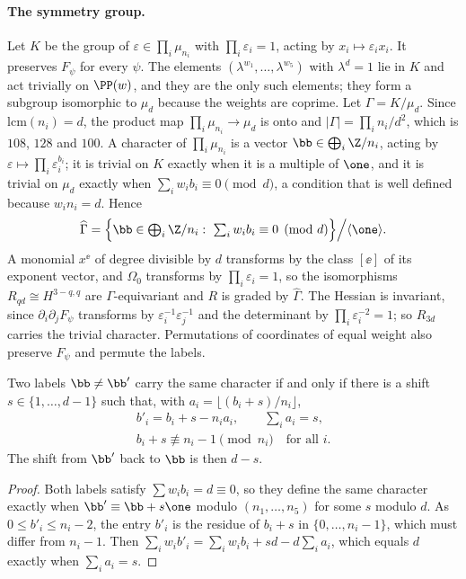 \paragraph*{The symmetry group.}
Let $K$ be the group of $\varepsilon\in\prod_i\mu_{n_i}$ with
$\prod_i\varepsilon_i=1$, acting by $x_i\mapsto\varepsilon_ix_i$. It
preserves $F_\psi$ for every $\psi$. The elements
$(\lambda^{w_1},\dots,\lambda^{w_5})$ with $\lambda^d=1$ lie in $K$ and act
trivially on $\PP(w)$, and they are the only such elements; they form a
subgroup isomorphic to $\mu_d$ because the weights are coprime. Let
$\Gamma=K/\mu_d$. Since $\mathrm{lcm}(n_i)=d$, the product map
$\prod_i\mu_{n_i}\to\mu_d$ is onto and $|\Gamma|=\prod_in_i/d^2$, which is
$108$, $128$ and $100$. A character of $\prod_i\mu_{n_i}$ is a vector
$\bb\in\bigoplus_i\Z/n_i$, acting by $\varepsilon\mapsto\prod_i
\varepsilon_i^{b_i}$; it is trivial on $K$ exactly when it is a multiple of
$\one$, and it is trivial on $\mu_d$ exactly when $\sum_iw_ib_i\equiv0
\pmod d$, a condition that is well defined because $w_in_i=d$. Hence
\[
\widehat\Gamma=\Big\{\bb\in\textstyle\bigoplus_i\Z/n_i:\ \sum_iw_ib_i
\equiv0\pmod d\Big\}\Big/\langle\one\rangle .
\]
A monomial $x^{\ee}$ of degree divisible by $d$ transforms by the class
$[\ee]$ of its exponent vector, and $\Omega_0$ transforms by
$\prod_i\varepsilon_i=1$, so the isomorphisms $R_{qd}\cong H^{3-q,q}$ are
$\Gamma$-equivariant and $R$ is graded by $\widehat\Gamma$. The Hessian is
invariant, since $\partial_i\partial_jF_\psi$ transforms by
$\varepsilon_i^{-1}\varepsilon_j^{-1}$ and the determinant by
$\prod_i\varepsilon_i^{-2}=1$; so $R_{3d}$ carries the trivial character.
Permutations of coordinates of equal weight also preserve $F_\psi$ and
permute the labels.

\begin{lemma}[Wrapping]\label{lem:wwrap}
Two labels $\bb\ne\bb'$ carry the same character if and only if there is a
shift $s\in\{1,\dots,d-1\}$ such that, with $a_i=\lfloor(b_i+s)/n_i\rfloor$,
\[
\begin{gathered}
b'_i=b_i+s-n_ia_i,\qquad \sum_ia_i=s,\\
b_i+s\not\equiv n_i-1\pmod{n_i}\quad\text{for all }i .
\end{gathered}
\]
The shift from $\bb'$ back to $\bb$ is then $d-s$.
\end{lemma}

\begin{proof}
Both labels satisfy $\sum w_ib_i=d\equiv0$, so they define the same
character exactly when $\bb'\equiv\bb+s\one$ modulo $(n_1,\dots,n_5)$ for
some $s$ modulo $d$. As $0\le b'_i\le n_i-2$, the entry $b'_i$ is the
residue of $b_i+s$ in $\{0,\dots,n_i-1\}$, which must differ from $n_i-1$.
Then $\sum_iw_ib'_i=\sum_iw_ib_i+sd-d\sum_ia_i$, which equals $d$ exactly
when $\sum_ia_i=s$.
\end{proof}

